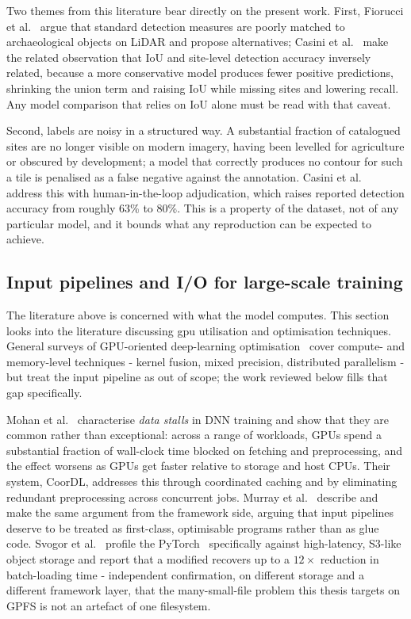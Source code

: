 Two themes from this literature bear directly on the present work.
First, Fiorucci et al.~\cite{Fiorucci22} argue that standard detection measures are poorly
matched to archaeological objects on LiDAR and propose alternatives; Casini et
al.~\cite{Casini23} make the related observation that IoU and site-level detection
accuracy inversely related, because a more conservative model
produces fewer positive predictions, shrinking the union term and raising IoU while
missing sites and lowering recall.
Any model comparison that relies on IoU alone must be read with that caveat.

Second, labels are noisy in a structured way.
A substantial fraction of catalogued sites are no longer visible on modern imagery,
having been levelled for agriculture or obscured by development; a model that
correctly produces no contour for such a tile is penalised as a false negative
against the annotation.
Casini et al.~\cite{Casini23} address this with human-in-the-loop adjudication,
which raises reported detection accuracy from roughly 63\% to 80\%.
This is a property of the dataset, not of any particular model, and it bounds what
any reproduction can be expected to achieve.

\subsection{Input pipelines and I/O for large-scale training}
\label{sec:lit-io}

The literature above is concerned with what the model computes.
This section looks into the literature discussing gpu utilisation and optimisation techniques. 
General surveys of GPU-oriented deep-learning optimisation~\cite{Mittal19} cover
compute- and memory-level techniques - kernel fusion, mixed precision,
distributed parallelism - but treat the input pipeline as out of scope; the
work reviewed below fills that gap specifically.

Mohan et al.~\cite{Mohan21} characterise \emph{data stalls} in DNN training and show
that they are common rather than exceptional: across a range of workloads,
GPUs spend a substantial fraction of wall-clock time blocked on fetching and
preprocessing, and the effect worsens as GPUs get faster relative to storage
and host CPUs.
Their system, CoorDL, addresses this through coordinated caching and by eliminating
redundant preprocessing across concurrent jobs.
Murray et al.~\cite{Murray21} describe  and make the same argument from
the framework side, arguing that input pipelines deserve to be treated as
first-class, optimisable programs rather than as glue code.
Svogor et al.~\cite{Svogor22} profile the PyTorch~\cite{Paszke19}
 specifically
against high-latency, S3-like object storage and report that a modified
 recovers up to a $12\times$ reduction in batch-loading
time - independent confirmation, on different storage and a different framework
layer, that the many-small-file problem this thesis targets on GPFS is not an
artefact of one filesystem.

